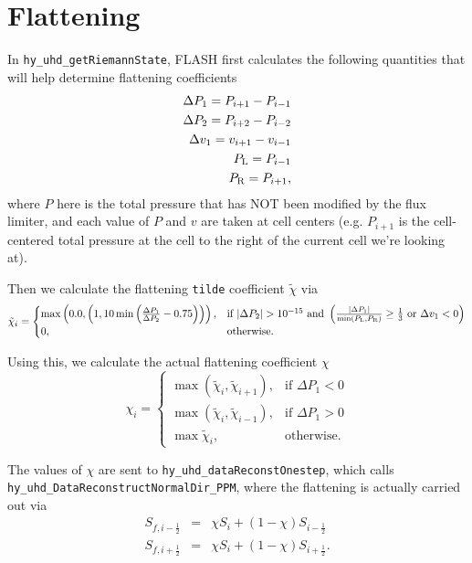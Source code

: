 \documentclass[preprint,11pt]{aastex}
\newcommand{\bea}{\begin{eqnarray}}
\newcommand{\eea}{\end{eqnarray}}
\begin{document}
\section{Flattening}
In \verb!hy_uhd_getRiemannState!, FLASH first calculates the following quantities that will help determine flattening coefficients
\bea
\Delta P_1 = P_{i+1} - P_{i-1} \\
\Delta P_2 = P_{i+2} - P_{i-2} \\
\Delta v_1 = v_{i+1} - v_{i-1} \\
P_{\rm L}  = P_{i-1} \\
P_{\rm R}  = P_{i+1},
\eea
where $P$ here is the total pressure that has NOT been modified by the flux limiter, and each value of $P$ and $v$ are taken at cell centers (e.g. $P_{i+1}$ is the cell-centered total pressure at the cell to the right of the current cell we're looking at).

Then we calculate the flattening \verb!tilde! coefficient $\tilde{\chi}$ via
\[
    \tilde{\chi}_i = 
\begin{cases}
		\max\left(0.0,\left(1,10 \min\left(\frac{\Delta P_1}{\Delta P_2} - 0.75\right)\right)\right),& \text{if } |\Delta P_2| > 10^{-15} \text{ and }\left(\frac{|\Delta P_1|}{\min(P_{\rm L}, P_{\rm R})} \geq \frac{1}{3}\text{ or }\Delta v_1 < 0\right)\\
    0,              & \text{otherwise}.
\end{cases}
\]

Using this, we calculate the actual flattening coefficient $\chi$
\[
    \chi_i = 
\begin{cases}
		\max \left( \tilde{\chi}_i,\tilde{\chi}_{i+1} \right),& \text{if } \Delta P_1 < 0 \\
		\max \left( \tilde{\chi}_i,\tilde{\chi}_{i-1} \right),& \text{if } \Delta P_1 > 0 \\
    \max \tilde{\chi}_i,              & \text{otherwise}.
\end{cases}
\]

The values of $\chi$ are sent to \verb!hy_uhd_dataReconstOnestep!, which calls \verb!hy_uhd_DataReconstructNormalDir_PPM!, where the flattening is actually carried out via
\bea
S_{f,i-\frac{1}{2}} &=& \chi S_i + (1 - \chi) S_{i-\frac{1}{2}}  \\
S_{f,i+\frac{1}{2}} &=& \chi S_i + (1 - \chi) S_{i+\frac{1}{2}}.  \\
\eea
\end{document}
